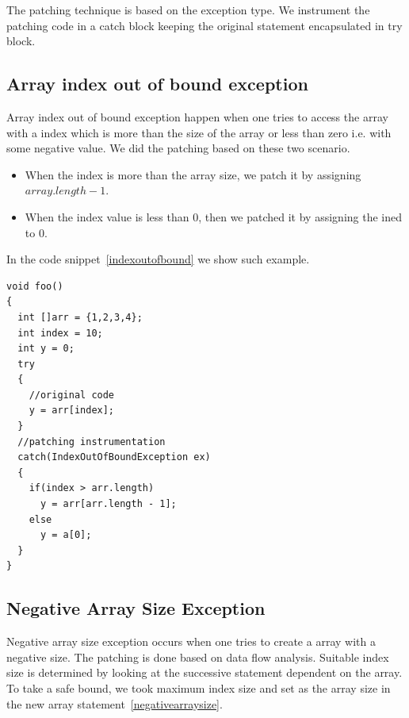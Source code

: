 The patching technique is based on the exception type. We instrument the
patching code in a catch block keeping the original statement encapsulated in
try block.

\subsection{Array index out of bound exception}

Array index out of bound exception happen when one tries to access the array
with a index which is more than the size of the array or less than zero i.e.
with some negative value. We did the patching based on these two scenario.

\begin{itemize}
  \item When the index is more than the array size, we patch it by assigning
  $array.length - 1$.
  \item When the index value is less than $0$, then we patched it by assigning
  the ined to $0$.
\end{itemize}

In the code snippet~\ref{indexoutofbound} we show such example.


\onehalfspacing

\lstset{language=Java, caption=array index out of bound patching,
label=indexoutofbound}

\begin{lstlisting}
void foo()
{
  int []arr = {1,2,3,4};
  int index = 10;
  int y = 0;
  try
  {
    //original code
    y = arr[index];
  }
  //patching instrumentation
  catch(IndexOutOfBoundException ex)
  {
    if(index > arr.length)
      y = arr[arr.length - 1];
    else
      y = a[0];
  }
}

\end{lstlisting}

\doublespacing
\subsection{Negative Array Size Exception}

Negative array size exception occurs when one tries to create a array with a
negative size.
The patching is done based on data flow analysis. Suitable index size is
determined by looking at the successive statement dependent on the array.
To take a safe bound, we took maximum index size and set as the array size in
the new array statement~\ref{negativearraysize}.


\onehalfspacing
\lstset{language=Java, caption=arr index out of bound patching,
label=negativearraysize}

